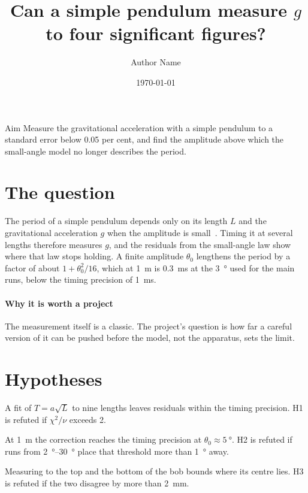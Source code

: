 \documentclass[11pt]{article}
\title{Can a simple pendulum measure $g$ to four significant figures?}
\author{Author Name}
\date{\today}
\begin{document}
\maketitle

\begin{statement}{Aim}
Measure the gravitational acceleration with a simple pendulum to a standard error below 0.05 per cent, and find the amplitude above which the small-angle model no longer describes the period.
\end{statement}

\section{The question}

The period of a simple pendulum depends only on its length $L$ and the gravitational acceleration $g$ when the amplitude is small~\cite{nelson1986}. Timing it at several lengths therefore measures $g$, and the residuals from the small-angle law show where that law stops holding. A finite amplitude $\theta_0$ lengthens the period by a factor of about $1 + \theta_0^2/16$, which at \qty{1}{\metre} is \qty{0.3}{\milli\second} at the \qty{3}{\degree} used for the main runs, below the timing precision of \qty{1}{\milli\second}.

\paragraph{Why it is worth a project} The measurement itself is a classic. The project's question is how far a careful version of it can be pushed before the model, not the apparatus, sets the limit.

\section{Hypotheses}

\begin{claims}
  \item[\badgetarget{H1}]  A fit of $T = a\sqrt{L}$ to nine lengths leaves residuals within the timing precision. H1 is refuted if $\chi^2/\nu$ exceeds 2.
  \item[\badgetarget{H2}]  At \qty{1}{\metre} the correction reaches the timing precision at $\theta_0 \approx \qty{5}{\degree}$. H2 is refuted if runs from \qtyrange{2}{30}{\degree} place that threshold more than \qty{1}{\degree} away.
  \item[\badgetarget{H3}]  Measuring to the top and the bottom of the bob bounds where its centre lies. H3 is refuted if the two disagree by more than \qty{2}{\milli\metre}.
\end{claims}
\end{document}
